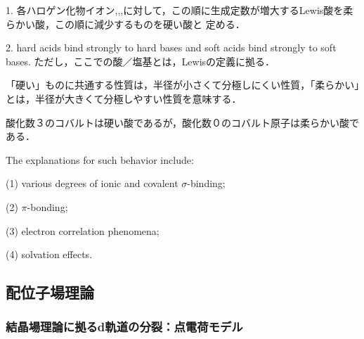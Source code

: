 \documentclass[uplatex, dvipdfmx]{jsreport}
\begin{document}
\begin{definition}
    1. 各ハロゲン化物イオン,,,に対して，この順に生成定数が増大するLewis酸を柔らかい酸，この順に減少するものを硬い酸と
    定める．

    2. hard acids bind strongly to hard bases and soft acids bind strongly to soft bases. ただし，ここでの酸／塩基とは，Lewisの定義に拠る．
\end{definition}
\begin{remark}
    「硬い」ものに共通する性質は，半径が小さくて分極しにくい性質，「柔らかい」とは，半径が大きくて分極しやすい性質を意味する．
\end{remark}
\begin{example}
    酸化数３のコバルトは硬い酸であるが，酸化数０のコバルト原子は柔らかい酸である．
\end{example}

\begin{theory}
    The explanations for such behavior include: 
    
    (1) various degrees of ionic and covalent $\sigma$-binding; 
    
    (2) $\pi$-bonding; 
    
    (3) electron correlation phenomena; 
    
    (4) solvation effects.
\end{theory}

\subsection{配位子場理論}

\subsubsection{結晶場理論に拠るd軌道の分裂：点電荷モデル}
\end{document}
